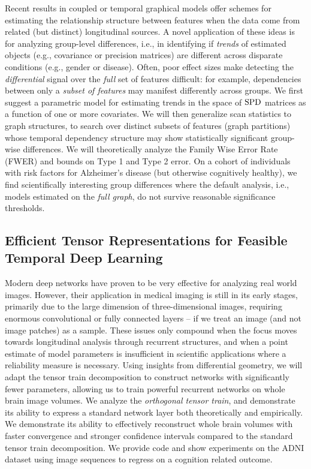 Recent results in coupled or temporal graphical models offer schemes for estimating the relationship structure 
between features when the data come from
related (but distinct) longitudinal sources. A novel application of these ideas is for analyzing group-level differences, i.e., in identifying if {\em trends} of estimated objects (e.g., 
covariance or precision matrices) are different across disparate conditions (e.g., gender or disease). Often, poor effect sizes make detecting the \textit{differential} signal 
over the {\em full} set of features difficult: for example, 
dependencies between only a {\em subset of features} may manifest differently across groups.
We first suggest
a parametric model 
for estimating trends in the space of $\text{SPD}$ matrices as a function of one or more covariates.
We will then generalize scan statistics to graph structures, 
to search over distinct subsets of features (graph partitions) whose temporal dependency structure may show statistically 
significant group-wise differences.
We will theoretically analyze the Family Wise Error Rate (FWER) and bounds on Type 1 and Type 2 error. 
On a cohort of individuals with risk factors for Alzheimer's disease (but otherwise cognitively healthy), 
we 
find scientifically interesting 
group differences where the default analysis, 
i.e., models estimated on the {\em full graph}, do not survive reasonable 
significance thresholds. 


\subsection{Efficient Tensor Representations for Feasible Temporal Deep Learning}

Modern deep networks have proven to be very effective for analyzing real world images.
However, their application in medical imaging is still in its early stages,
primarily due to the large dimension of three-dimensional images, requiring enormous convolutional or fully connected layers --
if we treat an image (and not image patches) as a sample. 
These issues only compound when the focus moves towards longitudinal analysis
through recurrent structures, and when a point estimate of model parameters is insufficient 
in scientific applications where a reliability measure is necessary.
Using insights from differential geometry, 
we will adapt 
the tensor train decomposition to construct networks
with significantly fewer parameters,
allowing us to train powerful recurrent networks on whole brain image volumes. 
We analyze 
the \textit{orthogonal tensor train},
and demonstrate its ability to express a standard network layer both theoretically and empirically.
We 
demonstrate its ability to 
effectively reconstruct whole brain volumes
with faster convergence and stronger confidence intervals
compared to the standard tensor train decomposition. 
We provide code and show experiments on the ADNI dataset
using image sequences to regress on a cognition related outcome.

